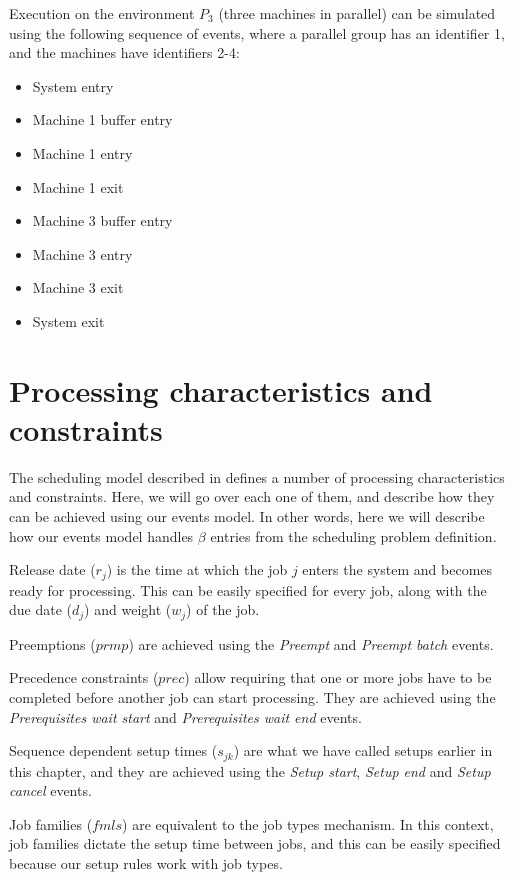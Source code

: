 Execution on the environment $P_3$ (three machines in parallel) can be simulated using the following sequence of events, where a parallel group has an identifier 1, and the machines have identifiers 2-4:
\begin{itemize}
    \item System entry
    \item Machine 1 buffer entry
    \item Machine 1 entry
    \item Machine 1 exit
    \item Machine 3 buffer entry
    \item Machine 3 entry
    \item Machine 3 exit
    \item System exit
  \end{itemize}

\section{Processing characteristics and constraints}
\label{sec:processing_characteristics_and_constraints}

The scheduling model described in \citep{pinedo2016scheduling} defines a number of processing characteristics and constraints. Here, we will go over each one of them, and describe how they can be achieved using our events model. In other words, here we will describe how our events model handles $\beta$ entries from the scheduling problem definition.

Release date ($r_j$) is the time at which the job $j$ enters the system and becomes ready for processing. This can be easily specified for every job, along with the due date ($d_j$) and weight ($w_j$) of the job.

Preemptions ($prmp$) are achieved using the \textit{Preempt} and \textit{Preempt batch} events.

Precedence constraints ($prec$) allow requiring that one or more jobs have to be completed before another job can start processing. They are achieved using the \textit{Prerequisites wait start} and \textit{Prerequisites wait end} events.

Sequence dependent setup times ($s_{jk}$) are what we have called setups earlier in this chapter, and they are achieved using the \textit{Setup start}, \textit{Setup end} and \textit{Setup cancel} events.

Job families ($fmls$) are equivalent to the job types mechanism. In this context, job families dictate the setup time between jobs, and this can be easily specified because our setup rules work with job types.

